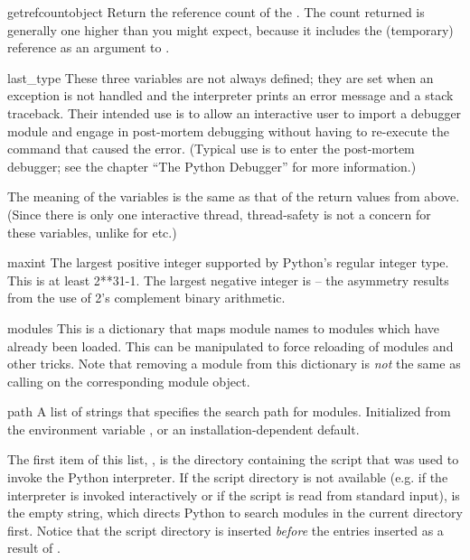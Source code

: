 \begin{funcdesc}{getrefcount}{object}
Return the reference count of the .  The count returned is
generally one higher than you might expect, because it includes the
(temporary) reference as an argument to .
\end{funcdesc}

\begin{datadesc}{last_type}
These three variables are not always defined; they are set when an
exception is not handled and the interpreter prints an error message
and a stack traceback.  Their intended use is to allow an interactive
user to import a debugger module and engage in post-mortem debugging
without having to re-execute the command that caused the error.
(Typical use is  to enter the post-mortem
debugger; see the chapter ``The Python Debugger'' for more
information.)

The meaning of the variables is the same
as that of the return values from  above.
(Since there is only one interactive thread, thread-safety is not a
concern for these variables, unlike for  etc.)
\end{datadesc}

\begin{datadesc}{maxint}
The largest positive integer supported by Python's regular integer
type.  This is at least 2**31-1.  The largest negative integer is
 -- the asymmetry results from the use of 2's
complement binary arithmetic.
\end{datadesc}

\begin{datadesc}{modules}
  This is a dictionary that maps module names to modules which have
  already been loaded.  This can be manipulated to force reloading of
  modules and other tricks.  Note that removing a module from this
  dictionary is \emph{not} the same as calling
   on the corresponding module
  object.
\end{datadesc}

\begin{datadesc}{path}
  A list of strings that specifies the search path for modules.
  Initialized from the environment variable , or an
  installation-dependent default.  

The first item of this list, , is the 
directory containing the script that was used to invoke the Python 
interpreter.  If the script directory is not available (e.g.  if the 
interpreter is invoked interactively or if the script is read from 
standard input),  is the empty string, which directs 
Python to search modules in the current directory first.  Notice that 
the script directory is inserted \emph{before} the entries inserted as 
a result of .  
\end{datadesc}

